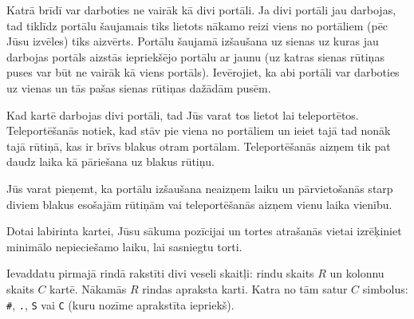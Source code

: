 \documentclass{boi2014-lv}
\newcommand{\constant}[1]{{\tt #1}}
\begin{document}
		Katrā brīdī var darboties ne vairāk kā divi portāli. Ja divi portāli jau darbojas, tad tiklīdz portālu šaujamais tiks lietots nākamo reizi viens no portāliem (pēc Jūsu izvēles) tiks aizvērts. Portālu šaujamā izšaušana uz sienas uz kuras jau darbojas portāls aizstās iepriekšējo portālu ar jaunu (uz katras sienas rūtiņas puses var būt ne vairāk kā viens portāls). Ievērojiet, ka abi portāli var darboties uz vienas un tās pašas sienas rūtiņas dažādām pusēm.

		Kad kartē darbojas divi portāli, tad Jūs varat tos lietot lai teleportētos. Teleportēšanās notiek, kad stāv pie viena no portāliem un ieiet tajā tad nonāk tajā rūtiņā, kas ir brīvs blakus otram portālam. Teleportēšanās aizņem tik pat daudz laika kā pāriešana uz blakus rūtiņu.

		Jūs varat pieņemt, ka portālu izšaušana neaizņem laiku un pārvietošanās starp diviem blakus esošajām rūtiņām vai teleportēšanās aizņem vienu laika vienību.

    \Task
    
		Dotai labirinta kartei, Jūsu sākuma pozīcijai un tortes atrašanās vietai izrēķiniet minimālo nepieciešamo laiku, lai sasniegtu torti.

    \Input
		
		Ievaddatu pirmajā rindā rakstīti divi veseli skaitļi: rindu skaits $R$ un kolonnu skaits $C$ kartē. Nākamās $R$ rindas apraksta karti. Katra no tām satur $C$ simbolus: \constant{\#}, \constant{.}, \constant{S} vai \constant{C} (kuru nozīme aprakstīta iepriekš).
		
\end{document}
